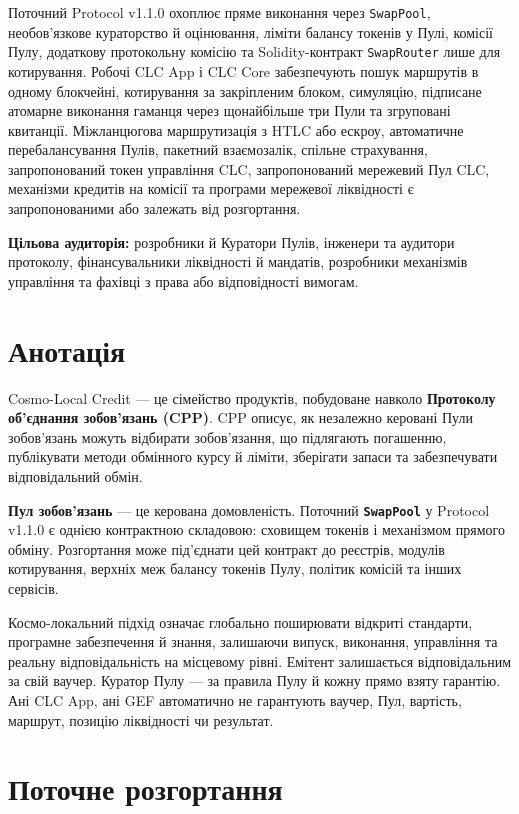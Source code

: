 \documentclass[11pt]{article}
\begin{document}
Поточний Protocol v1.1.0 охоплює пряме виконання через \texttt{SwapPool}, необов'язкове кураторство й оцінювання, ліміти балансу токенів у Пулі, комісії Пулу, додаткову протокольну комісію та Solidity-контракт \texttt{SwapRouter} лише для котирування. Робочі CLC App і CLC Core забезпечують пошук маршрутів в одному блокчейні, котирування за закріпленим блоком, симуляцію, підписане атомарне виконання гаманця через щонайбільше три Пули та згруповані квитанції. Міжланцюгова маршрутизація з HTLC або ескроу, автоматичне перебалансування Пулів, пакетний взаємозалік, спільне страхування, запропонований токен управління CLC, запропонований мережевий Пул CLC, механізми кредитів на комісії та програми мережевої ліквідності є запропонованими або залежать від розгортання.

\textbf{Цільова аудиторія:} розробники й Куратори Пулів, інженери та аудитори протоколу, фінансувальники ліквідності й мандатів, розробники механізмів управління та фахівці з права або відповідності вимогам.

\section*{Анотація}

Cosmo-Local Credit --- це сімейство продуктів, побудоване навколо \textbf{Протоколу об'єднання зобов'язань (CPP)}. CPP описує, як незалежно керовані Пули зобов'язань можуть відбирати зобов'язання, що підлягають погашенню, публікувати методи обмінного курсу й ліміти, зберігати запаси та забезпечувати відповідальний обмін.

\textbf{Пул зобов'язань} --- це керована домовленість. Поточний \textbf{\texttt{SwapPool}} у Protocol v1.1.0 є однією контрактною складовою: сховищем токенів і механізмом прямого обміну. Розгортання може під'єднати цей контракт до реєстрів, модулів котирування, верхніх меж балансу токенів Пулу, політик комісій та інших сервісів.

Космо-локальний підхід означає глобально поширювати відкриті стандарти, програмне забезпечення й знання, залишаючи випуск, виконання, управління та реальну відповідальність на місцевому рівні. Емітент залишається відповідальним за свій ваучер. Куратор Пулу --- за правила Пулу й кожну прямо взяту гарантію. Ані CLC App, ані GEF автоматично не гарантують ваучер, Пул, вартість, маршрут, позицію ліквідності чи результат.

\section*{Поточне розгортання}
\end{document}
